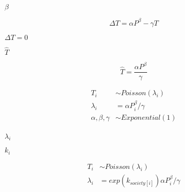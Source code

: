 \documentclass[10pt]{book}
\begin{document}
\begin{mdSnippets}
\begin{mdInlineSnippet}%
{$\beta$}\end{mdInlineSnippet}%
\begin{mdDisplaySnippet}[b35f6a7bd6415aa6fb694ce88a2be0e7]%
\[%
\Delta T = \alpha P ^ \beta - \gamma T
\]%
\end{mdDisplaySnippet}%
\begin{mdInlineSnippet}[ef3ef03e97771932c6cebef461a98b19]%
{$ \Delta T = 0$}\end{mdInlineSnippet}%
\begin{mdInlineSnippet}[64dd028921851ea59c21d6317c1d8d28]%
{$\hat T$}\end{mdInlineSnippet}%
\begin{mdDisplaySnippet}[6d211f1ffff62c605f3915469c96659b]%
\[%
\hat T = \frac{\alpha P ^ \beta}{\gamma}
\]%
\end{mdDisplaySnippet}%
\begin{mdDisplaySnippet}[7f8ef66525074271e06d367009bf095f]%
\[%
\begin{aligned}
T_i &\sim Poisson(\lambda_i) \\
\lambda_i &= \alpha P_i ^ \beta/\gamma \\
\alpha, \beta, \gamma &\sim Exponential(1) \\
\end{aligned}
\]%
\end{mdDisplaySnippet}%
\begin{mdInlineSnippet}[5614371f803f8a78b18b27391549a107]%
{$\lambda_i$}\end{mdInlineSnippet}%
\begin{mdInlineSnippet}%
{$k_i$}\end{mdInlineSnippet}%
\begin{mdDisplaySnippet}[136d857eb252dffed84c218d279b4089]%
\[%
\begin{aligned}
T_i &\sim Poisson(\lambda_i) \\
\lambda_i &= exp(k_{society[i]}) \alpha P_i ^ \beta / \gamma
\end{aligned}
\]%
\end{mdDisplaySnippet}%

\end{mdSnippets}
\end{document}
